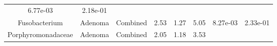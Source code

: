\documentclass[12pt,]{article}
\begin{document}
\begin{longtable}[]{@{}cccccccc@{}}
\begin{minipage}[t]{0.06\columnwidth}
6.77e-03\strut
\end{minipage} & \begin{minipage}[t]{0.06\columnwidth}\centering\strut
2.18e-01\strut
\end{minipage}\tabularnewline
\begin{minipage}[t]{0.19\columnwidth}\centering\strut
Fusobacterium\strut
\end{minipage} & \begin{minipage}[t]{0.07\columnwidth}\centering\strut
Adenoma\strut
\end{minipage} & \begin{minipage}[t]{0.09\columnwidth}\centering\strut
Combined\strut
\end{minipage} & \begin{minipage}[t]{0.03\columnwidth}\centering\strut
2.53\strut
\end{minipage} & \begin{minipage}[t]{0.14\columnwidth}\centering\strut
1.27\strut
\end{minipage} & \begin{minipage}[t]{0.14\columnwidth}\centering\strut
5.05\strut
\end{minipage} & \begin{minipage}[t]{0.06\columnwidth}\centering\strut
8.27e-03\strut
\end{minipage} & \begin{minipage}[t]{0.06\columnwidth}\centering\strut
2.33e-01\strut
\end{minipage}\tabularnewline
\begin{minipage}[t]{0.19\columnwidth}\centering\strut
Porphyromonadaceae\strut
\end{minipage} & \begin{minipage}[t]{0.07\columnwidth}\centering\strut
Adenoma\strut
\end{minipage} & \begin{minipage}[t]{0.09\columnwidth}\centering\strut
Combined\strut
\end{minipage} & \begin{minipage}[t]{0.03\columnwidth}\centering\strut
2.05\strut
\end{minipage} & \begin{minipage}[t]{0.14\columnwidth}\centering\strut
1.18\strut
\end{minipage} & \begin{minipage}[t]{0.14\columnwidth}\centering\strut
3.53\strut
\end{minipage} & \begin{minipage}[t]{0.06\columnwidth}\centering\strut

\end{minipage}
\end{longtable}
\end{document}
